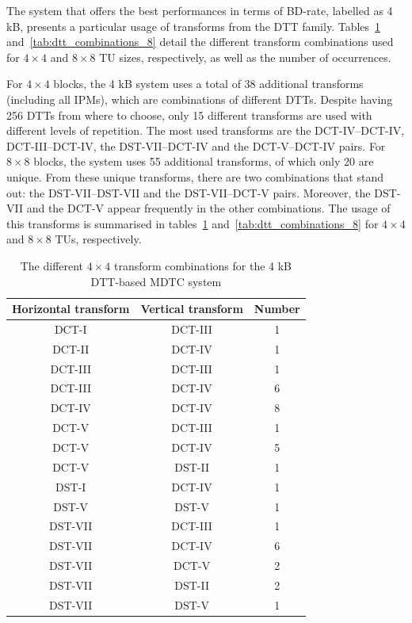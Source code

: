 \documentclass[11pt,a4paper,openright,twoside]{book}
\numberwithin{equation}{section} %
\numberwithin{figure}{section} %
\numberwithin{table}{section} %
\begin{document}
The system that offers the best performances in terms of \acs{BD}-rate,
labelled as 4 kB, presents a particular usage of transforms from the \ac{DTT}
family.
Tables~\ref{tab:dtt_combinations_4} and~\ref{tab:dtt_combinations_8} detail
the different transform combinations used for $4\times4$ and $8\times8$
\ac{TU} sizes, respectively, as well as the number of occurrences.

For $4\times4$ blocks, the 4 kB system uses a total of 38 additional
transforms (including all \acp{IPM}), which are combinations of different
\acp{DTT}.
Despite having 256 \acp{DTT} from where to choose, only 15 different
transforms are used with different levels of repetition.
The most used transforms are the \acs{DCT}-IV--\acs{DCT}-IV,
\acs{DCT}-III--\acs{DCT}-IV, the \acs{DST}-VII--\acs{DCT}-IV and the
\acs{DCT}-V--\acs{DCT}-IV pairs.
For $8\times8$ blocks, the system uses 55 additional transforms, of which only
20 are unique.
From these unique transforms, there are two combinations that stand out: the
\acs{DST}-VII--\acs{DST}-VII and the \acs{DST}-VII--\acs{DCT}-V pairs.
Moreover, the \acs{DST}-VII and the \acs{DCT}-V appear frequently in the
other combinations.
The usage of this transforms is summarised  in
tables~\ref{tab:dtt_combinations_4} and~\ref{tab:dtt_combinations_8} for
$4\times4$ and $8\times8$ \acp{TU}, respectively.

\begin{table}[tb]
	\centering
	\small
	\begin{tabular}{cc|c}
		Horizontal transform & Vertical transform & Number \\
		\hline\hline
		DCT-I   & DCT-III & 1 \\
		DCT-II  & DCT-IV  & 1 \\
		DCT-III & DCT-III & 1 \\
		DCT-III & DCT-IV  & 6 \\
		DCT-IV  & DCT-IV  & 8 \\
		DCT-V   & DCT-III & 1 \\
		DCT-V   & DCT-IV  & 5 \\
		DCT-V   & DST-II  & 1 \\
		DST-I   & DCT-IV  & 1 \\
		DST-V   & DST-V   & 1 \\
		DST-VII & DCT-III & 1 \\
		DST-VII & DCT-IV  & 6 \\
		DST-VII & DCT-V   & 2 \\
		DST-VII & DST-II  & 2 \\
		DST-VII & DST-V   & 1 \\
	\end{tabular}
	\caption{The different $4\times4$ transform combinations for the 4
	kB \acs{DTT}-based \acs{MDTC} system}
	\label{tab:dtt_combinations_4}
\end{table}
\end{document}
